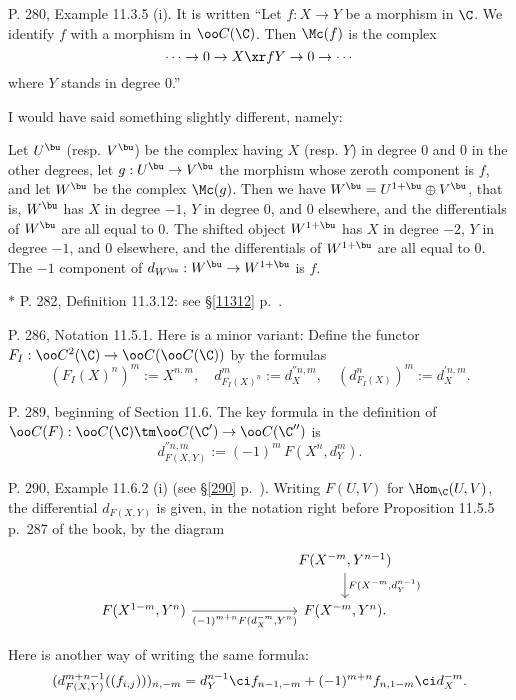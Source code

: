 \documentclass[12pt]{article}
\theoremstyle{remark}
\theoremstyle{definition}
\begin{document}
\begin{s}
P. 280, Example 11.3.5 (i). It is written ``Let $f:X\to Y$ be a morphism in $\C$. We identify $f$ with a morphism in $\oo C(\C)$. Then $\Mc(f)$ is the complex 
$$
\cdots\to0\to X\xr fY\to0\to\cdots
$$ 
where $Y$ stands in degree 0.'' 

I would have said something slightly different, namely:

Let $U^\bu$ (resp. $V^\bu$) be the complex having $X$ (resp. $Y$) in degree 0 and 0 in the other degrees, let $g:U^\bu\to V^\bu$ the morphism whose zeroth component is $f$, and let $W^\bu$ be the complex $\Mc(g)$. Then we have $W^\bu=U^{1+\bu}\oplus V^\bu$, that is, $W^\bu$ has $X$ in degree $-1$, $Y$ in degree 0, and 0 elsewhere, and the differentials of $W^\bu$ are all equal to 0. The shifted object $W^{1+\bu}$ has $X$ in degree $-2$, $Y$ in degree $-1$, and 0 elsewhere, and the differentials of $W^{1+\bu}$ are all equal to 0. The $-1$ component of $d_{W^\bu}:W^\bu\to W^{1+\bu}$ is $f$.
\end{s}

%

\nn$*$ P. 282, Definition 11.3.12: see \S\ref{11312} p.~.

%

\begin{s}
P. 286, Notation 11.5.1. Here is a minor variant: Define the functor $F_I:\oo C^2(\C)\to\oo C(\oo C(\C))$ by the formulas 
$$
(F_I(X)^n)^m:=X^{n,m},\quad d^m_{F_I(X)^n}:=d_X^{''n,m},\quad(d^n_{F_I(X)})^m:=d_X^{'n,m}.
$$
\end{s}

%

\begin{s}
P. 289, beginning of Section 11.6. The key formula in the definition of $\oo C(F):\oo C(\C)\tm\oo C(\C')\to\oo C(\C'')$ is 
$$
d_{F(X,Y)}^{''n,m}:=(-1)^m\,F(X^n,d_Y^m).
$$
\end{s}

%

\begin{s}
P. 290, Example 11.6.2 (i) (see \S\ref{290} p.~). Writing $F(U,V)$ for $\Hom_\C(U,V)$, the differential $d_{F(X,Y)}$ is given, in the notation right before Proposition 11.5.5 p.~287 of the book, by the diagram
$$
\begin{tikzcd}
&&&F(X^{-m},Y^{n-1})\ar{d}{F(X^{-m},d_Y^{n-1})}\\ 
F(X^{1-m},Y^n)\ar{rrr}[swap]{(-1)^{m+n}F(d_X^{-m},Y^n)}&&&F(X^{-m},Y^n).
\end{tikzcd}
$$

Here is another way of writing the same formula:
$$
(d_{F(X,Y)}^{m+n-1}((f_{i,j})))_{n,-m}=d_Y^{n-1}\ci f_{n-1,-m}+(-1)^{m+n}f_{n,1-m}\ci d_X^{-m}.
$$
\end{s}
\end{document}
